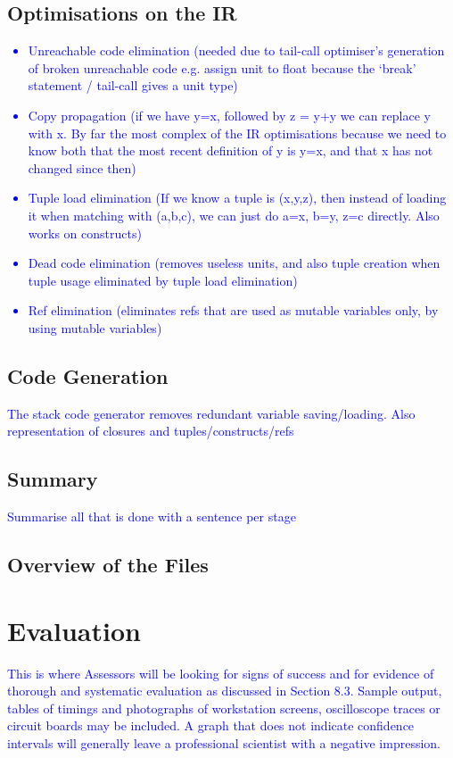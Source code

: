\documentclass[12pt,twoside,notitlepage]{report}
\newcommand\note[1]{\textcolor{blue}{#1}}
\begin{document}
\section{Optimisations on the IR}
\note{
	\begin{itemize}
		\item Unreachable code elimination (needed due to tail-call optimiser's generation of broken unreachable code e.g. assign unit to float because the `break' statement / tail-call gives a unit type)
		\item Copy propagation (if we have y=x, followed by z = y+y we can replace y with x. By far the most complex of the IR optimisations because we need to know both that the most recent definition of y is y=x, and that x has not changed since then)
		\item Tuple load elimination (If we know a tuple is (x,y,z), then instead of loading it when matching with (a,b,c), we can just do a=x, b=y, z=c directly. Also works on constructs)
		\item Dead code elimination (removes useless units, and also tuple creation when tuple usage eliminated by tuple load elimination)
		\item Ref elimination (eliminates refs that are used as mutable variables only, by using mutable variables)
	\end{itemize}
}

\section{Code Generation}
\note{The stack code generator removes redundant variable saving/loading. Also representation of closures and tuples/constructs/refs}

\section{Summary}
\note{Summarise all that is done with a sentence per stage}

\section{Overview of the Files}

\clearpage
\chapter{Evaluation}
\note{This is where Assessors will be looking for signs of success and for evidence of thorough and systematic evaluation as discussed in Section 8.3. Sample output, tables of timings and photographs of workstation screens, oscilloscope traces or circuit boards may be included. A graph that does not indicate confidence intervals will generally leave a professional scientist with a negative impression.}
\end{document}
